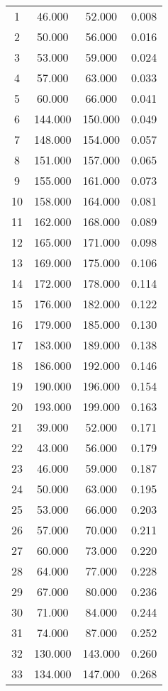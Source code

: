 % 
\begin{tabular}{cccc}
  \hline
  \hline
1 & 46.000 & 52.000 & 0.008 \\ 
  2 & 50.000 & 56.000 & 0.016 \\ 
  3 & 53.000 & 59.000 & 0.024 \\ 
  4 & 57.000 & 63.000 & 0.033 \\ 
  5 & 60.000 & 66.000 & 0.041 \\ 
  6 & 144.000 & 150.000 & 0.049 \\ 
  7 & 148.000 & 154.000 & 0.057 \\ 
  8 & 151.000 & 157.000 & 0.065 \\ 
  9 & 155.000 & 161.000 & 0.073 \\ 
  10 & 158.000 & 164.000 & 0.081 \\ 
  11 & 162.000 & 168.000 & 0.089 \\ 
  12 & 165.000 & 171.000 & 0.098 \\ 
  13 & 169.000 & 175.000 & 0.106 \\ 
  14 & 172.000 & 178.000 & 0.114 \\ 
  15 & 176.000 & 182.000 & 0.122 \\ 
  16 & 179.000 & 185.000 & 0.130 \\ 
  17 & 183.000 & 189.000 & 0.138 \\ 
  18 & 186.000 & 192.000 & 0.146 \\ 
  19 & 190.000 & 196.000 & 0.154 \\ 
  20 & 193.000 & 199.000 & 0.163 \\ 
  21 & 39.000 & 52.000 & 0.171 \\ 
  22 & 43.000 & 56.000 & 0.179 \\ 
  23 & 46.000 & 59.000 & 0.187 \\ 
  24 & 50.000 & 63.000 & 0.195 \\ 
  25 & 53.000 & 66.000 & 0.203 \\ 
  26 & 57.000 & 70.000 & 0.211 \\ 
  27 & 60.000 & 73.000 & 0.220 \\ 
  28 & 64.000 & 77.000 & 0.228 \\ 
  29 & 67.000 & 80.000 & 0.236 \\ 
  30 & 71.000 & 84.000 & 0.244 \\ 
  31 & 74.000 & 87.000 & 0.252 \\ 
  32 & 130.000 & 143.000 & 0.260 \\ 
  33 & 134.000 & 147.000 & 0.268 \\ 

\end{tabular}
